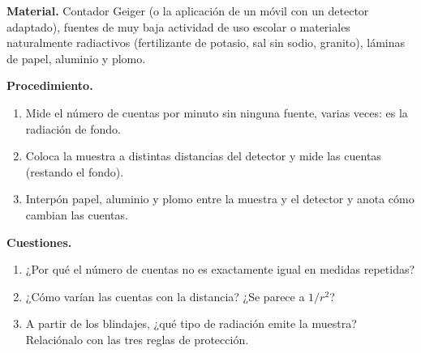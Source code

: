 \textbf{Material.} Contador Geiger (o la aplicación de un móvil con un detector adaptado), fuentes de muy baja actividad de uso escolar o
materiales naturalmente radiactivos (fertilizante de potasio, sal sin sodio, granito), láminas de papel, aluminio y plomo.

\textbf{Procedimiento.}
\begin{enumerate}[label=\numberballmDarkTeal]
    \item Mide el número de cuentas por minuto sin ninguna fuente, varias veces: es la radiación de fondo.
    \item Coloca la muestra a distintas distancias del detector y mide las cuentas (restando el fondo).
    \item Interpón papel, aluminio y plomo entre la muestra y el detector y anota cómo cambian las cuentas.
\end{enumerate}

\textbf{Cuestiones.}
\begin{enumerate}[label=\letraminuscula]
    \item ¿Por qué el número de cuentas no es exactamente igual en medidas repetidas?
    \item ¿Cómo varían las cuentas con la distancia? ¿Se parece a \(1/r^2\)?
    \item A partir de los blindajes, ¿qué tipo de radiación emite la muestra? Relaciónalo con las tres reglas de protección.
\end{enumerate}
